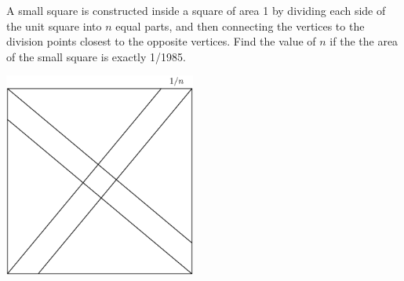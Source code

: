 A small square is constructed inside a square of area 1 by dividing each side of the unit square into $n$ equal parts, and then connecting the vertices to the division points closest to the opposite vertices.  Find the value of $n$ if the the area of the small square is exactly 1/1985.
\begin{center}
\includegraphics[width = 63.0mm]{img/fig0.png}
\end{center}